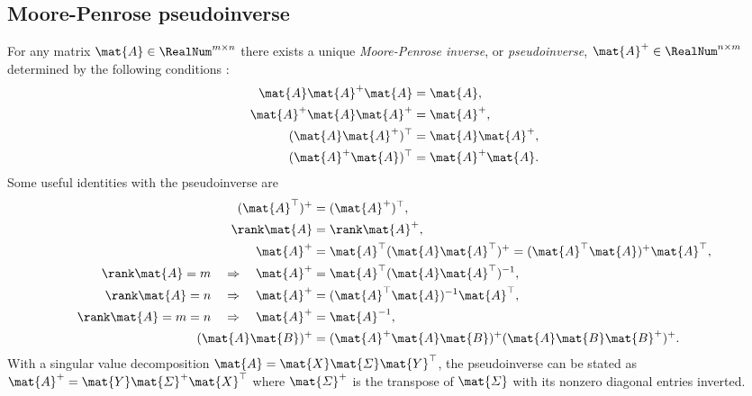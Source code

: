 \subsection{Moore-Penrose pseudoinverse}\label{sec:Pseudoinverse}
For any matrix $\mat{A}\in\RealNum^{m\times n}$ there exists a unique \textit{Moore-Penrose inverse}, or \textit{pseudoinverse}, $\mat{A}^+ \in \RealNum^{n\times m}$ determined by the following conditions \cite[Theo.\ 1]{Penrose:Pseudoinverse}:
\begin{subequations}\label{eq:AppendixPenroseConditions}
\begin{align}
 \mat{A} \mat{A}^+ \mat{A} &= \mat{A},
\\
 \mat{A}^+ \mat{A} \mat{A}^+ &= \mat{A}^+,
\\
 (\mat{A} \mat{A}^+)^\top &= \mat{A} \mat{A}^+,
\\
 (\mat{A}^+ \mat{A})^\top &= \mat{A}^+ \mat{A}.
\end{align}
\end{subequations}
Some useful identities with the pseudoinverse are
\begin{subequations}
\begin{align}
 (\mat{A}^\top)^+ &= (\mat{A}^+)^\top,
\\
 \rank\mat{A} &= \rank\mat{A}^+,
\\
 \mat{A}^+ &= \mat{A}^\top (\mat{A}\mat{A}^\top)^+ = (\mat{A}^\top \mat{A})^+ \mat{A}^\top,
\label{eq:pinvSymmetricCase}
\\
 \rank\mat{A} = m \quad \Rightarrow \quad \mat{A}^+ &= \mat{A}^\top (\mat{A} \mat{A}^\top)^{-1},
\\
 \rank\mat{A} = n \quad \Rightarrow \quad \mat{A}^+ &= (\mat{A}^\top \mat{A})^{-1} \mat{A}^\top,
\\
 \rank\mat{A} = m = n \quad \Rightarrow \quad \mat{A}^+ &= \mat{A}^{-1},
\\
 (\mat{A}\mat{B})^+ &= (\mat{A}^+ \mat{A} \mat{B})^+(\mat{A} \mat{B} \mat{B}^+)^+.
\end{align}
\end{subequations}
With a singular value decomposition $\mat{A} = \mat{X} \mat{\varSigma} \mat{Y}^\top$, the pseudoinverse can be stated as $\mat{A}^+ = \mat{Y} \mat{\varSigma}^+ \mat{X}^\top$ where $\mat{\varSigma}^+$ is the transpose of $\mat{\varSigma}$ with its nonzero diagonal entries inverted.

